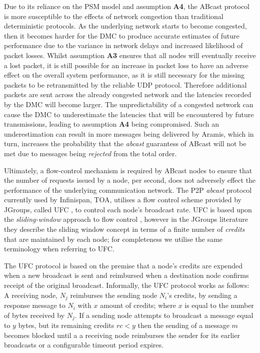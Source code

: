 Due to its reliance on the PSM model and assumption \textbf{A4}, the \textsf{ABcast} protocol is more susceptible to the effects of network congestion than traditional deterministic protocols.  As the underlying network starts to become congested, then it becomes harder for the DMC to produce accurate estimates of future performance due to the variance in network delays and increased likelihood of packet losses.  Whilst assumption \textbf{A3} ensures that all nodes will eventually receive a lost packet, it is still possible for an increase in packet loss to have an adverse effect on the overall system performance, as it is still necessary for the missing packets to be retransmitted by the reliable UDP protocol.  Therefore additional packets are sent across the already congested network and the latencies recorded by the DMC will become larger.  The unpredictability of a congested network can cause the DMC to underestimate the latencies that will be encountered by future transmissions, leading to assumption \textbf{A4} being compromised.  Such an underestimation can result in more messages being delivered by \textsf{Aramis}, which in turn, increases the probability that the \emph{abcast} guarantess of \textsf{ABcast} will not be met due to messages being \emph{rejected} from the total order.  

Ultimately, a flow-control mechanism is required by \textsf{ABcast} nodes to ensure that the number of requests issued by a node, per second, does not adversely effect the performance of the underlying communication network.  The P2P \emph{abcast} protocol currently used by Infinispan, TOA, utilises a flow control scheme provided by JGroups, called \textsf{UFC} \citep{JGroupsUFC}, to control each node's broadcast rate.  \textsf{UFC} is based upon the \emph{sliding-window} approach to flow control \citep{bertsekas1992DataNetworksFC}, however in the JGroups literature they describe the sliding window concept in terms of a finite number of \emph{credits} that are maintained by each node; for completeness we utilise the same terminology when referring to \textsf{UFC}.  

The \textsf{UFC} protocol is based on the premise that a node's credits are expended when a new broadcast is sent and reimbursed when a destination node confirms receipt of the original broadcast.  Informally, the \textsf{UFC} protocol works as follows: A receiving node, $N_j$ reimburses the sending node $N_i$'s credits, by sending a response message to $N_i$ with $x$ amount of credits; where $x$ is equal to the number of bytes received by $N_j$.  If a sending node  attempts to broadcast a message equal to $y$ bytes, but its remaining credits $rc < y$ then the sending of a message $m$ becomes blocked until a a receiving node reimburses the sender for its earlier broadcasts or a configurable timeout period expires.  

